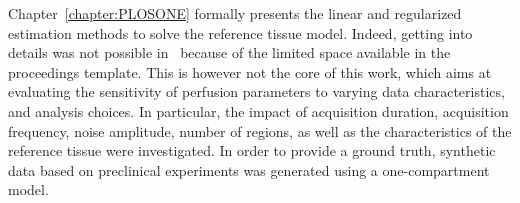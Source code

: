 Chapter~\ref{chapter:PLOSONE} formally presents the linear and regularized estimation methods to solve the reference tissue model.
Indeed, getting into details was not possible in~\cite{Doury2017wn} because of the limited space available in the proceedings template.
This is however not the core of this work, which aims at evaluating the sensitivity of perfusion parameters to varying data characteristics, and analysis choices.
In particular, the impact of acquisition duration, acquisition frequency, noise amplitude, number of regions, as well as the characteristics of the reference tissue were investigated.
In order to provide a ground truth, synthetic data based on preclinical experiments was generated using a one-compartment model.